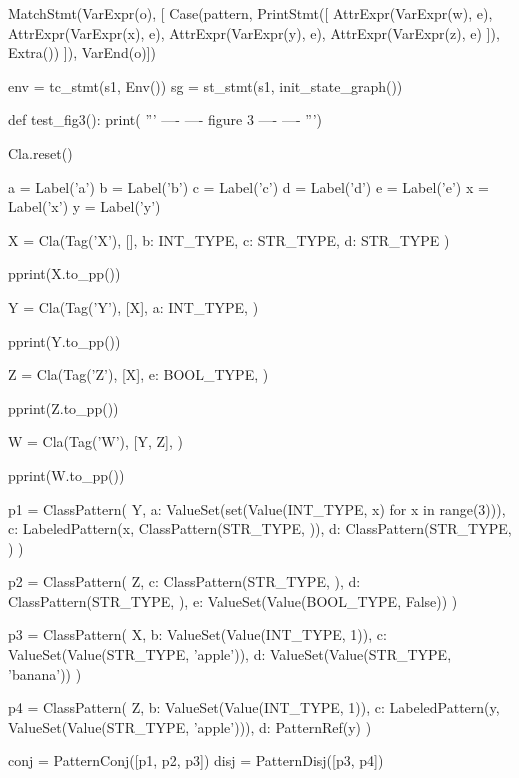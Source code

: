 \begin{dispPy}
        MatchStmt(VarExpr(o), [
            Case(pattern, PrintStmt([
                AttrExpr(VarExpr(w), e),
                AttrExpr(VarExpr(x), e),
                AttrExpr(VarExpr(y), e),
                AttrExpr(VarExpr(z), e)
                ]), Extra())
            ]),
        VarEnd(o)])

    env = tc_stmt(s1, Env())
    sg = st_stmt(s1, init_state_graph())


def test_fig3():
    print(
'''
----
---- figure 3 ----
----
''')

    Cla.reset()

    a = Label('a')
    b = Label('b')
    c = Label('c')
    d = Label('d')
    e = Label('e')
    x = Label('x')
    y = Label('y')

    X = Cla(Tag('X'),
        [],
        {
            b: INT_TYPE,
            c: STR_TYPE,
            d: STR_TYPE
        })

    pprint(X.to_pp())

    Y = Cla(Tag('Y'),
        [X],
        {
            a: INT_TYPE,
        })

    pprint(Y.to_pp())

    Z = Cla(Tag('Z'),
        [X],
        {
            e: BOOL_TYPE,
        })

    pprint(Z.to_pp())

    W = Cla(Tag('W'),
        [Y, Z],
        {})

    pprint(W.to_pp())

    p1 = ClassPattern(
        Y,
        {
            a: ValueSet(set(Value(INT_TYPE, x) for x in range(3))),
            c: LabeledPattern(x, ClassPattern(STR_TYPE, {})),
            d: ClassPattern(STR_TYPE, {})
        })

    p2 = ClassPattern(
        Z,
        {
            c: ClassPattern(STR_TYPE, {}),
            d: ClassPattern(STR_TYPE, {}),
            e: ValueSet({Value(BOOL_TYPE, False)})
        })

    p3 = ClassPattern(
        X,
        {
            b: ValueSet({Value(INT_TYPE, 1)}),
            c: ValueSet({Value(STR_TYPE, 'apple')}),
            d: ValueSet({Value(STR_TYPE, 'banana')})
        })

    p4 = ClassPattern(
        Z,
        {
            b: ValueSet({Value(INT_TYPE, 1)}),
            c: LabeledPattern(y, ValueSet({Value(STR_TYPE, 'apple')})),
            d: PatternRef(y)
        })

    conj = PatternConj([p1, p2, p3])
    disj = PatternDisj([p3, p4])


\end{dispPy}
